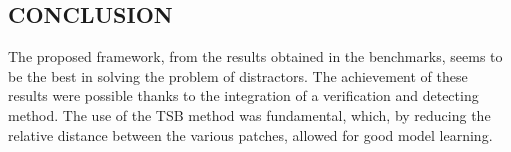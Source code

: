 \subsection{CONCLUSION}
The proposed framework, from the results obtained in the benchmarks, seems 
to be the best in solving the problem of distractors. The achievement of these 
results were possible thanks to the integration of a verification and detecting 
method. The use of the TSB method was fundamental, which, by reducing 
the relative distance between the various patches, allowed for good model 
learning.